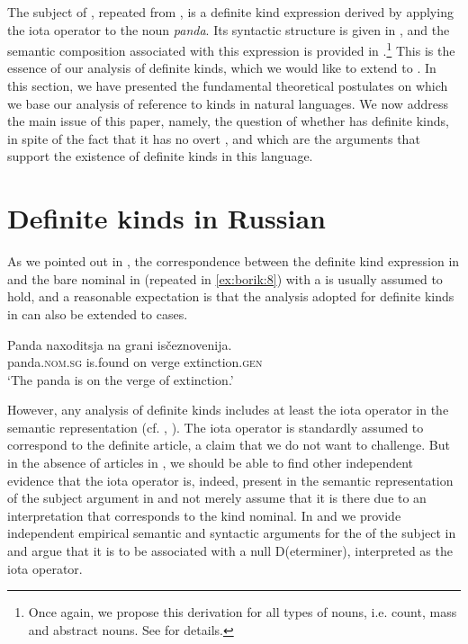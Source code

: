 \documentclass[output=paper
,modfonts
,nonflat]{langsci/langscibook}
\begin{document}
	The subject of , repeated from , is a definite kind expression derived by applying the iota operator to the noun \textit{panda}. Its syntactic structure is given in , and the semantic composition associated with this expression is provided in .\footnote{Once again, we propose this derivation for all types of nouns, i.e. count, mass and abstract nouns. See \citet{Borik2015} for details.} This is the essence of our analysis of definite kinds, which we would like to extend to . 
	In this section, we have presented the fundamental theoretical postulates on which we base our analysis of reference to kinds in natural languages. We now address the main issue of this paper, namely, the question of whether  has definite kinds, in spite of the fact that it has no overt , and which are the arguments that support the existence of definite kinds in this language. 
	
	\section{Definite kinds in Russian} \label{sec:borik:3}
	
	As we pointed out in , the correspondence between the  definite kind expression in  and the  bare nominal in  (repeated in \ref{ex:borik:8}) with a  is usually assumed to hold, and a reasonable expectation is that the analysis adopted for definite kinds in  can also be extended to  cases. 
	
	\ea\label{ex:borik:8}
	\gll Panda naxoditsja		na		grani		is\v{c}eznovenija. \\
	panda.\textsc{nom.sg} 	is.found 			on		verge		extinction.\textsc{gen}\\
	\glt `The panda is on the verge of extinction.'
	\z
	
	However, any analysis of  definite kinds includes at least the iota operator in the semantic representation (cf. \citealt{Chierchia1998}, \citealt{Dayal2004}). The iota operator is standardly assumed to correspond to the definite article, a claim that we do not want to challenge. But in the absence of articles in , we should be able to find other independent evidence that the iota operator is, indeed, present in the semantic representation of the subject argument in  and not merely assume that it is there due to an interpretation that corresponds to the  kind nominal. In  and  we provide independent empirical semantic and syntactic arguments for the  of the subject in  and argue that it is to be associated with a null D(eterminer), interpreted as the iota operator. 
	
\end{document}
